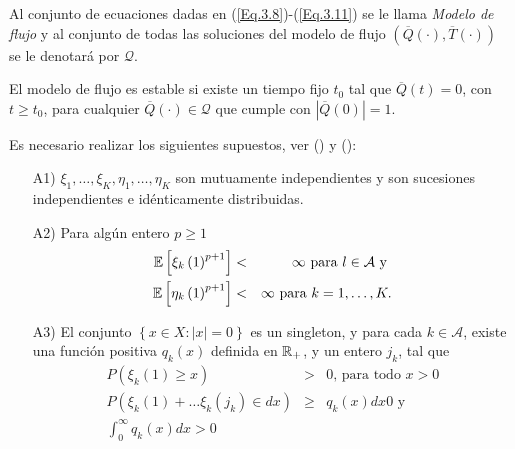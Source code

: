 Al conjunto de ecuaciones dadas en (\ref{Eq.3.8})-(\ref{Eq.3.11}) se
le llama {\em Modelo de flujo} y al conjunto de todas las
soluciones del modelo de flujo
$\left(\overline{Q}\left(\cdot\right),\overline{T}
\left(\cdot\right)\right)$ se le denotar\'a por $\mathcal{Q}$.


\begin{Def}
El modelo de flujo es estable si existe un tiempo fijo $t_{0}$ tal
que $\overline{Q}\left(t\right)=0$, con $t\geq t_{0}$, para
cualquier $\overline{Q}\left(\cdot\right)\in\mathcal{Q}$ que
cumple con $|\overline{Q}\left(0\right)|=1$.
\end{Def}


%

Es necesario realizar los siguientes supuestos, ver (\cite{Dai2}) y (\cite{DaiSean}):

\begin{itemize}
\item[A1)] $\xi_{1},\ldots,\xi_{K},\eta_{1},\ldots,\eta_{K}$ son
mutuamente independientes y son sucesiones independientes e
id\'enticamente distribuidas.

\item[A2)] Para alg\'un entero $p\geq1$
\begin{eqnarray*}
\mathbb{E}\left[\xi_{k}\left(1\right)^{p+1}\right]&<&\infty\textrm{ para }l\in\mathcal{A}\textrm{ y }\\
\mathbb{E}\left[\eta_{k}\left(1\right)^{p+1}\right]&<&\infty\textrm{ para
}k=1,\ldots,K.
\end{eqnarray*}
\item[A3)] El conjunto $\left\{x\in X:|x|=0\right\}$ es un
singleton, y para cada $k\in\mathcal{A}$, existe una funci\'on
positiva $q_{k}\left(x\right)$ definida en $\mathbb{R}_{+}$, y un entero
$j_{k}$, tal que
\begin{eqnarray}
P\left(\xi_{k}\left(1\right)\geq x\right)&>&0\textrm{, para todo }x>0\\
P\left(\xi_{k}\left(1\right)+\ldots\xi_{k}\left(j_{k}\right)\in dx\right)&\geq& q_{k}\left(x\right)dx0\textrm{ y }\\
\int_{0}^{\infty}q_{k}\left(x\right)dx>0
\end{eqnarray}
\end{itemize}


